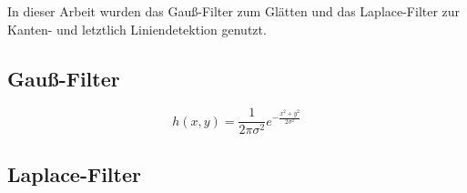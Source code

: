 In dieser Arbeit wurden das Gauß-Filter zum Glätten und das Laplace-Filter zur Kanten- und letztlich Liniendetektion genutzt.

\subsection{Gauß-Filter}

\begin{equation}
h(x,y) = \frac{1}{2\pi\sigma^2} e^{-\frac{x^2+y^2}{2\sigma^2}}
\end{equation}

\subsection{Laplace-Filter}
